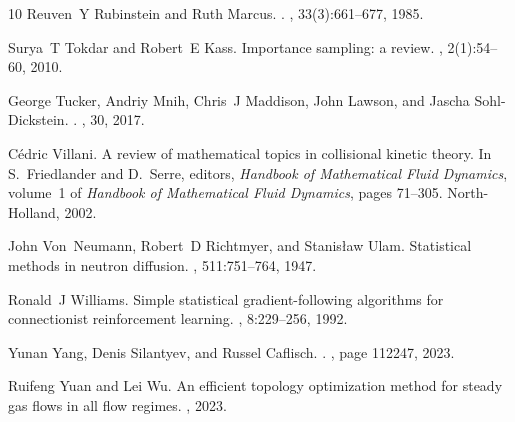 \documentclass[12pt]{amsart}
\begin{document}
\begin{thebibliography}{10}
Reuven~Y Rubinstein and Ruth Marcus.
.
, 33(3):661--677, 1985.

Surya~T Tokdar and Robert~E Kass.
\newblock Importance sampling: a review.
,
  2(1):54--60, 2010.

George Tucker, Andriy Mnih, Chris~J Maddison, John Lawson, and Jascha
  Sohl-Dickstein.
.
, 30, 2017.

C{\'e}dric Villani.
\newblock A review of mathematical topics in collisional kinetic theory.
\newblock In S.~Friedlander and D.~Serre, editors, {\em Handbook of
  Mathematical Fluid Dynamics}, volume~1 of {\em Handbook of Mathematical Fluid
  Dynamics}, pages 71--305. North-Holland, 2002.

John Von~Neumann, Robert~D Richtmyer, and Stanis{\l}aw Ulam.
\newblock Statistical methods in neutron diffusion.
, 511:751--764, 1947.

Ronald~J Williams.
\newblock Simple statistical gradient-following algorithms for connectionist
  reinforcement learning.
, 8:229--256, 1992.

Yunan Yang, Denis Silantyev, and Russel Caflisch.
.
, page 112247, 2023.

Ruifeng Yuan and Lei Wu.
\newblock An efficient topology optimization method for steady gas flows in all
  flow regimes.
, 2023.

\end{thebibliography}


\bigskip
\bigskip
\end{document}
